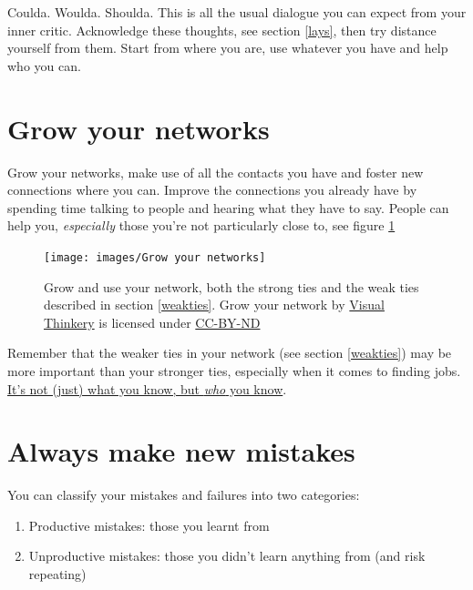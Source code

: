 \documentclass[
]{book}
\providecommand{\tightlist}{%
  \setlength{\itemsep}{0pt}\setlength{\parskip}{0pt}}
\begin{document}
Coulda. Woulda. Shoulda. This is all the usual dialogue you can expect from your inner critic. Acknowledge these thoughts, see section \ref{lays}, then try distance yourself from them. Start from where you are, use whatever you have and help who you can.

\hypertarget{networking}{%
\section{Grow your networks}\label{networking}}

Grow your networks, make use of all the contacts you have and foster new connections where you can. Improve the connections you already have by spending time talking to people and hearing what they have to say. People can help you, \emph{especially} those you're not particularly close to, see figure \ref{fig:yournetwork-fig}

\begin{figure}

{\centering \texttt{[image: images/Grow your networks]} 

}

\caption{Grow and use your network, both the strong ties and the weak ties described in section \ref{weakties}. Grow your network by \href{https://visualthinkery.com}{Visual Thinkery} is licensed under \href{https://creativecommons.org/licenses/by-nd/4.0/}{CC-BY-ND}}\label{fig:yournetwork-fig}
\end{figure}



Remember that the weaker ties in your network (see section \ref{weakties}) may be more important than your stronger ties, especially when it comes to finding jobs. \href{https://en.wiktionary.org/wiki/it\%27s_not_what_you_know_but_who_you_know}{It's not (just) what you know, but \emph{who} you know}.

\hypertarget{estherdyson}{%
\section{Always make new mistakes}\label{estherdyson}}

You can classify your mistakes and failures into two categories:

\begin{enumerate}
\def\labelenumi{\arabic{enumi}.}
\tightlist
\item
  Productive mistakes: those you learnt from
\item
  Unproductive mistakes: those you didn't learn anything from (and risk repeating)
\end{enumerate}
\end{document}
